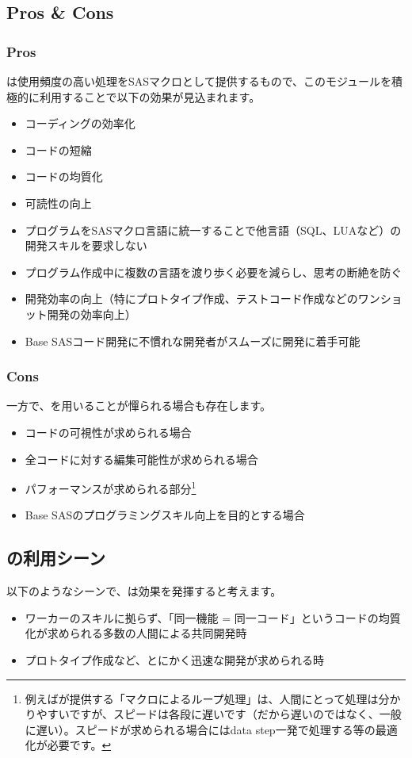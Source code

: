 \subsection{\RDM Pros \& Cons}
\subsubsection{Pros}
\RDM は使用頻度の高い処理をSASマクロとして提供するもので、このモジュールを積極的に利用することで以下の効果が見込まれます。
\begin{itemize}
	\item コーディングの効率化
	\item コードの短縮
	\item コードの均質化
	\item 可読性の向上
	\item プログラムをSASマクロ言語に統一することで他言語（SQL、LUAなど）の開発スキルを要求しない
	\item プログラム作成中に複数の言語を渡り歩く必要を減らし、思考の断絶を防ぐ
	\item 開発効率の向上（特にプロトタイプ作成、テストコード作成などのワンショット開発の効率向上）
	\item Base SASコード開発に不慣れな開発者がスムーズに開発に着手可能
\end{itemize}
\subsubsection{Cons}
一方で、\RDM を用いることが憚られる場合も存在します。
\begin{itemize}
	\item コードの可視性が求められる場合
	\item 全コードに対する編集可能性が求められる場合
	\item パフォーマンスが求められる部分\footnote{例えば\RDM が提供する「マクロによるループ処理」は、人間にとって処理は分かりやすいですが、スピードは各段に遅いです（\RDM だから遅いのではなく、一般に遅い）。スピードが求められる場合にはdata step一発で処理する等の最適化が必要です。}
	\item Base SASのプログラミングスキル向上を目的とする場合
\end{itemize}
 
\subsection{\RDM の利用シーン}
以下のようなシーンで、\RDM は効果を発揮すると考えます。
\begin{itemize}
\item ワーカーのスキルに拠らず、「同一機能 = 同一コード」というコードの均質化が求められる多数の人間による共同開発時
\item プロトタイプ作成など、とにかく迅速な開発が求められる時
\end{itemize}
 
